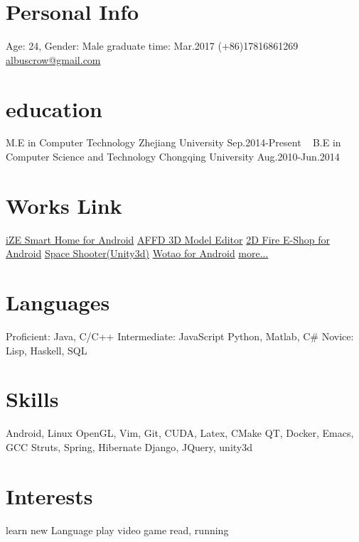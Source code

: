\documentclass[print]{friggeri-cv} %
\begin{document}


\begin{aside} %
\section{Personal Info}
Age: 24, Gender: Male
graduate time: Mar.2017
(+86)17816861269
\href{mailto:albuscrow@gmail.com}{albuscrow@gmail.com}
\section{education}
M.E in Computer Technology
Zhejiang University
Sep.2014-Present
~
B.E in Computer Science and Technology
Chongqing University
Aug.2010-Jun.2014
\section{Works Link}
\href{http://www.hisensehitachi.com/jstx/index.aspx?nodeid=1162}{iZE Smart Home for Android}
\href{https://github.com/albuscrow/AFFD}{AFFD 3D Model Editor}
\href{http://www.jinxizi.cn/android/huozhanggui.html}{2D Fire E-Shop for Android}
\href{https://github.com/albuscrow/learn_unity}{Space Shooter(Unity3d)}
\href{http://36kr.com/p/5043478.html}{Wotao for Android}
\href{https://github.com/albuscrow}{more...}
\section{Languages}
Proficient: Java, C/C++
Intermediate: JavaScript
Python, Matlab, C\#
Novice: Lisp, Haskell, SQL
\section{Skills}
\LARGE{Android}\normalsize{, }\LARGE{Linux}
\large{OpenGL}\normalsize{, }\large{Vim}\normalsize{, }\large{Git}\normalsize{, }
\normalsize{CUDA, Latex, CMake}
\normalsize{QT, Docker, Emacs, GCC}
\small{Struts}\normalsize{, }\small{Spring}\normalsize{, }\small{Hibernate}
\small{Django}\normalsize{, }\small{JQuery}\normalsize{, }\small{unity3d}
\section{Interests}
\normalsize{learn new Language
play video game
read, running}
\end{aside}
\end{document}
